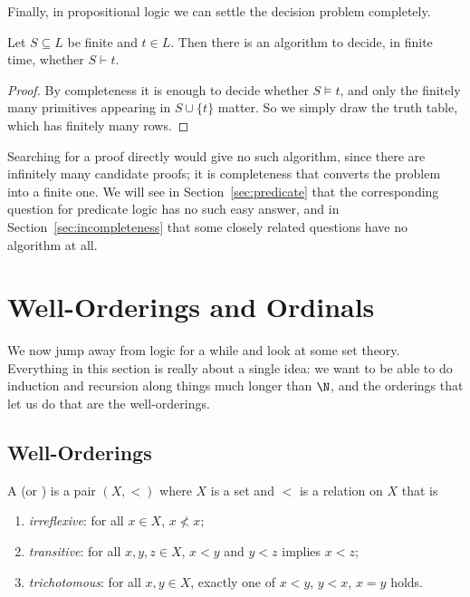 Finally, in propositional logic we can settle the decision problem completely.

\begin{theorem}[Decidability]
  Let $S \subseteq L$ be finite and $t \in L$. Then there is an algorithm to decide, in finite time, whether $S \vdash t$.
\end{theorem}
\begin{proof}
  By completeness it is enough to decide whether $S \models t$, and only the finitely many primitives appearing in $S \cup \{t\}$ matter. So we simply draw the truth table, which has finitely many rows.
\end{proof}

Searching for a proof directly would give no such algorithm, since there are infinitely many candidate proofs; it is completeness that converts the problem into a finite one. We will see in Section~\ref{sec:predicate} that the corresponding question for predicate logic has no such easy answer, and in Section~\ref{sec:incompleteness} that some closely related questions have no algorithm at all.

\section{Well-Orderings and Ordinals}

We now jump away from logic for a while and look at some set theory. Everything in this section is really about a single idea: we want to be able to do induction and recursion along things much longer than $\N$, and the orderings that let us do that are the well-orderings.

\subsection{Well-Orderings}

\begin{definition}
  A  (or ) is a pair $(X, <)$ where $X$ is a set and $<$ is a relation on $X$ that is
  \begin{enumerate}[label=(\roman*)]
    \item \emph{irreflexive}: for all $x \in X$, $x \not< x$;
    \item \emph{transitive}: for all $x, y, z \in X$, $x < y$ and $y < z$ implies $x < z$;
    \item \emph{trichotomous}: for all $x, y \in X$, exactly one of $x < y$, $y < x$, $x = y$ holds.
  \end{enumerate}
\end{definition}

